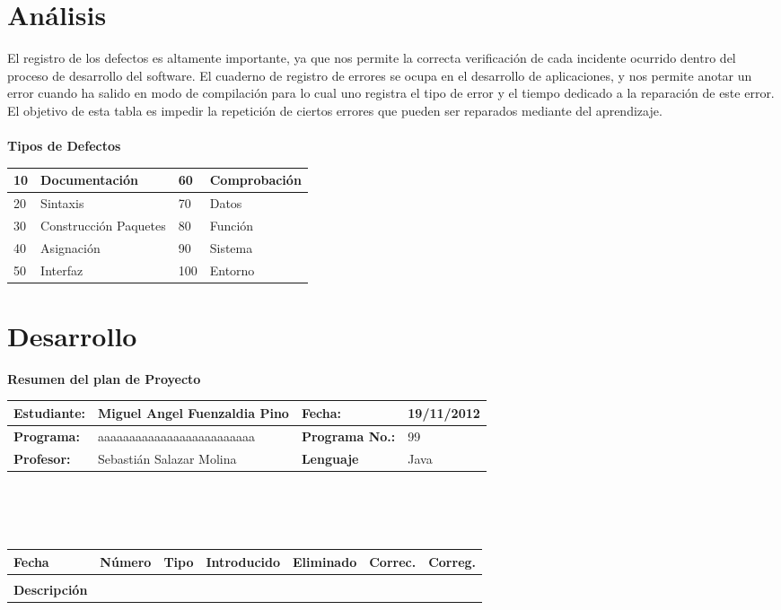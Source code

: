 \documentclass[a4paper,12pt,openany,oneside]{book}
\begin{document}
\section{Análisis}
El registro de los defectos es altamente importante, ya que nos permite la correcta verificación de cada incidente ocurrido dentro del proceso de desarrollo del software. El cuaderno de registro de errores se ocupa en el desarrollo de aplicaciones, y nos permite anotar un error cuando ha salido en modo de compilación para lo cual uno registra el tipo de error y el tiempo dedicado a la reparación de este error. El objetivo de esta tabla es impedir la repetición de ciertos errores que pueden ser reparados mediante del aprendizaje.\\
\\
\textbf{Tipos de Defectos}\\
\begin{tabular}{| l | l | l | l |}
\hline
10 & Documentación         & 60 & Comprobación\\
\hline
20 & Sintaxis              & 70 & Datos\\
\hline
30 & Construcción Paquetes & 80 & Función\\
\hline
40 & Asignación            & 90 & Sistema\\
\hline
50 & Interfaz              & 100 & Entorno\\
\hline
\end{tabular}
\section{Desarrollo}
\newpage
\textbf{Resumen del plan de Proyecto}\\
\begin{tabular}{| l | l | l | l |}
\hline
\textbf{Estudiante:} & Miguel Angel Fuenzaldia Pino & \textbf{Fecha:} & 19/11/2012\\
\hline
\textbf{Programa:} & aaaaaaaaaaaaaaaaaaaaaaaaa & \textbf{Programa No.:} & 99\\
\hline
\textbf{Profesor:} & Sebastián Salazar Molina & \textbf{Lenguaje} & Java  \\
\hline
\end{tabular}
\\\\\\
\begin{tabular}{| l | l | l | l | l | l | l |}
\hline
\textbf{Fecha} & \textbf{Número} & \textbf{Tipo} & \textbf{Introducido} & \textbf{Eliminado} & \textbf{Correc.} & \textbf{Correg.}\\
\hline
 & & & & & & \\
\hline
\textbf{Descripción} & \multicolumn{6}{|c|}{} \\
\hline
\end{tabular}
\end{document}
